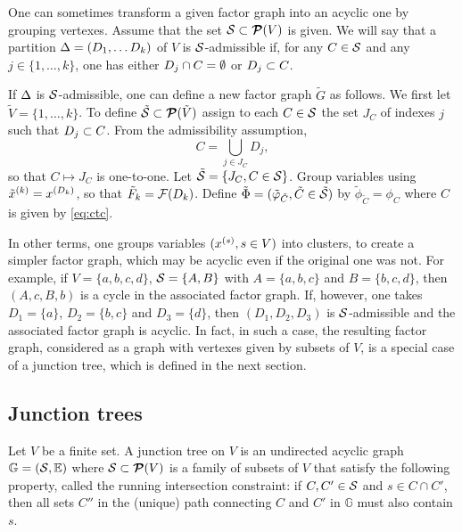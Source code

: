 \begin{remark}
\label{rem:JT.example}
One can sometimes transform a given factor graph into an acyclic one
by grouping vertexes. Assume that the set ${\mathcal S} \subset {\bm{\mathcal P}({V})}$ is
given. We will say that a partition  $\Delta = (D_1, \ldots D_k)$ of $V$
is ${\mathcal S}$-admissible if, for any $C\in {\mathcal S}$ and any $j\in \{1, \ldots,
k\}$, one has either $D_j\cap C = \emptyset$ or $D_j\subset C$. 

If $\Delta$ is ${\mathcal S}$-admissible, one can define a new factor graph $\tilde G$ as follows. We first let $\tilde V = \{1, \ldots,
k\}$. To define $\tilde {{\mathcal S}} \subset {\bm{\mathcal P}({\tilde V})}$ assign to each $C\in{\mathcal S}$ the set $J_C$ of indexes $j$ such that $D_j \subset C$.  From the admissibility assumption,
\begin{equation}
\label{eq:ctc}
C = \bigcup_{j\in J_C} D_j,
\end{equation}
so that $C \mapsto J_C$ is one-to-one.
Let $\tilde {{\mathcal S}} = \left\{ J_C, C\in{\mathcal S} \right\}$.
Group variables using $\tilde x^{(k)} = x^{(D_k)}$, so that $\tilde F_k = {\mathcal F}(D_k)$. Define $\tilde \Phi =
(\tilde{\varphi}_{\tilde C}, \tilde C \in\tilde {{\mathcal S}})$ by
$\tilde\phi_{\tilde C} = \phi_C$ where $C$ is given by
\cref{eq:ctc}.

In other terms, one groups variables $(x^{(s)}, s\in V)$ into clusters, to
create a simpler factor graph, which may be acyclic even if the
original one was not. For example, if $V = \{a,b,c,d\}$, ${\mathcal S} =\{A,
B\}$ with 
$A=\{a,b,c\}$ and $B = \{b,c,d\}$, then $(A, c, B, b)$ is a cycle in
the associated factor graph. If, however, one takes $D_1 = \{a\}$,
$D_2= \{b,c\}$ and $D_3 = \{d\}$, then $(D_1, D_2, D_3)$ is
${\mathcal S}$-admissible and  the associated factor graph is acyclic. In fact,
in such a case, the resulting factor graph, considered as a graph with
vertexes given by subsets of $V$, is a special case of a junction tree,
which is defined in the next section.
\end{remark}

\subsection{Junction trees}

\begin{definition}
\label{def:jct.tree}
Let $V$ be a finite set. A junction tree on $V$ is an undirected
acyclic graph $\mathbb G = ({\mathcal S}, \mathbb E)$ where ${\mathcal S} \subset {\bm{\mathcal P}({V})}$ is a family
of subsets of $V$ that satisfy the following property, called the running intersection constraint:
if $C, C'\in{\mathcal S}$ and $s\in C\cap C'$, then all sets $C''$ in the
(unique) path connecting $C$ and $C'$ in $\mathbb G$ must also contain
$s$.
\end{definition}

